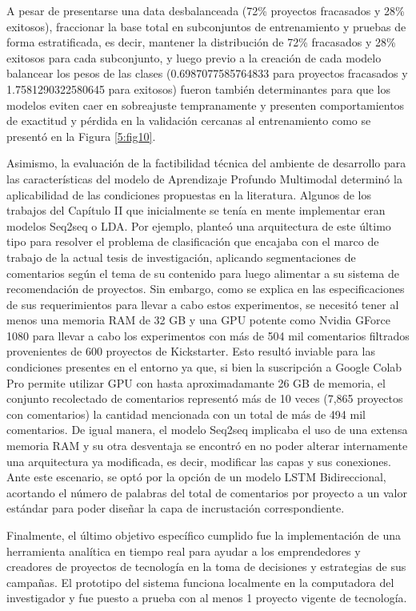 A pesar de presentarse una data desbalanceada (72\% proyectos fracasados y 28\% exitosos), fraccionar la base total en subconjuntos de entrenamiento y pruebas de forma estratificada, es decir, mantener la distribución de 72\% fracasados y 28\% exitosos para cada subconjunto, y luego previo a la creación de cada modelo balancear los pesos de las clases (0.6987077585764833 para proyectos fracasados y 1.7581290322580645 para exitosos) fueron también determinantes para que los modelos eviten caer en sobreajuste tempranamente y presenten comportamientos de exactitud y pérdida en la validación cercanas al entrenamiento como se presentó en la Figura \ref{5:fig10}.

Asimismo, la evaluación de la factibilidad técnica del ambiente de desarrollo para las características del modelo de Aprendizaje Profundo Multimodal determinó la aplicabilidad de las condiciones propuestas en la literatura. Algunos de los trabajos del Capítulo II que inicialmente se tenía en mente implementar eran modelos Seq2seq o LDA. Por ejemplo, \cite{pr_shafqat2019topicpredictions} planteó una arquitectura de este último tipo para resolver el problema de clasificación que encajaba con el marco de trabajo de la actual tesis de investigación, aplicando segmentaciones de comentarios según el tema de su contenido para luego alimentar a su sistema de recomendación de proyectos. Sin embargo, como se explica en las especificaciones de sus requerimientos para llevar a cabo estos experimentos, se necesitó tener al menos una memoria RAM de 32 GB y una GPU potente como Nvidia GForce 1080 para llevar a cabo los experimentos con más de 504 mil comentarios filtrados provenientes de 600 proyectos de Kickstarter. Esto resultó inviable para las condiciones presentes en el entorno ya que, si bien la suscripción a Google Colab Pro permite utilizar GPU con hasta aproximadamante 26 GB de memoria, el conjunto recolectado de comentarios representó más de 10 veces (7,865 proyectos con comentarios) la cantidad mencionada con un total de más de 494 mil comentarios. De igual manera, el modelo Seq2seq implicaba el uso de una extensa memoria RAM y su otra desventaja se encontró en no poder alterar internamente una arquitectura ya modificada, es decir, modificar las capas y sus conexiones. Ante este escenario, se optó por la opción de un modelo LSTM Bidireccional, acortando el número de palabras del total de comentarios por proyecto a un valor estándar para poder diseñar la capa de incrustación correspondiente.

Finalmente, el último objetivo específico cumplido fue la implementación de una herramienta analítica en tiempo real para ayudar a los emprendedores y creadores de proyectos de tecnología en la toma de decisiones y estrategias de sus campañas. El prototipo del sistema funciona localmente en la computadora del investigador y fue puesto a prueba con al menos 1 proyecto vigente de tecnología.

